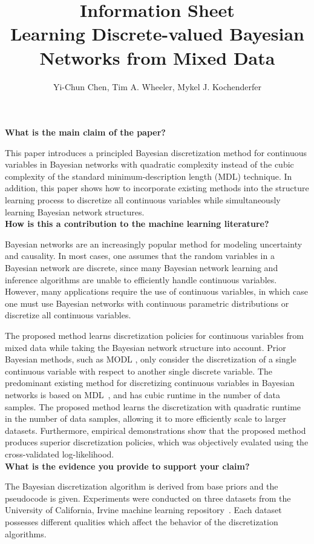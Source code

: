 \documentclass{article}
\title{Information Sheet \\ {\large Learning Discrete-valued Bayesian Networks from Mixed Data}}
\author{\normalsize Yi-Chun Chen, Tim A. Wheeler, Mykel J. Kochenderfer}
\date{}
\begin{document}
\maketitle

\noindent
\textbf{What is the main claim of the paper?}

This paper introduces a principled Bayesian discretization method for continuous variables in Bayesian networks with quadratic complexity instead of the cubic complexity of the standard minimum-description length (MDL) technique.
In addition, this paper shows how to incorporate existing methods into the structure learning process to discretize all continuous variables while simultaneously learning Bayesian network structures.\\[0em]

\noindent
\textbf{How is this a contribution to the machine learning literature?}

Bayesian networks are an increasingly popular method for modeling uncertainty and causality.
In most cases, one assumes that the random variables in a Bayesian network are discrete, since many Bayesian network learning and inference algorithms are unable to efficiently handle continuous variables.
However, many applications require the use of continuous variables, in which case one must use Bayesian networks with continuous parametric distributions or discretize all continuous variables.

The proposed method learns discretization policies for continuous variables from mixed data while taking the Bayesian network structure into account.
Prior Bayesian methods, such as MODL \citep{Boulle_2006, Lustgarten_2011}, only consider the discretization of a single continuous variable with respect to another single discrete variable.
The predominant existing method for discretizing continuous variables in Bayesian networks is based on MDL~\citep{Friedman_1996}, and has cubic runtime in the number of data samples.
The proposed method learns the discretization with quadratic runtime in the number of data samples, allowing it to more efficiently scale to larger datasets.
Furthermore, empirical demonstrations show that the proposed method produces superior discretization policies, which was objectively evalated using the cross-validated log-likelihood.\\[0em]

\noindent
\textbf{What is the evidence you provide to support your claim?}

The Bayesian discretization algorithm is derived from base priors and the pseudocode is given.
Experiments were conducted on three datasets from the University of California, Irvine machine learning repository~\citep{Lichman_2013}.
Each dataset possesses different qualities which affect the behavior of the discretization algorithms.
\end{document}
